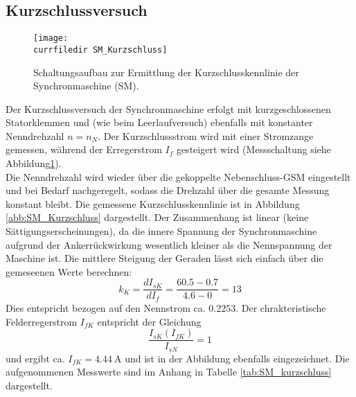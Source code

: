 \subsection{Kurzschlussversuch}
\begin{figure}
    \centering
    \texttt{[image: \\currfiledir SM\_Kurzschluss]}
    \caption{Schaltungsaufbau zur Ermittlung der Kurzschlusskennlinie der Synchronmaschine (SM).}
    \label{fig:SM_Kurzschluss}
\end{figure}
Der Kurzschlussversuch der Synchronmaschine erfolgt mit kurzgeschlossenen Statorklemmen und (wie beim Leerlaufversuch) ebenfalls mit konstanter Nenndrehzahl $n=n_N$. Der Kurzschlussstrom wird mit einer Stromzange gemessen, während der Erregerstrom $I_f$ gesteigert wird (Messschaltung siehe Abbildung\;\ref{fig:SM_Kurzschluss}).\\
Die Nenndrehzahl wird wieder über die gekoppelte Nebenschluss-GSM eingestellt und bei Bedarf nachgeregelt, sodass die Drehzahl über die gesamte Messung konstant bleibt. Die gemessene Kurzschlusskennlinie ist in Abbildung \ref{abb:SM_Kurzschluss} dargestellt. Der Zusammenhang ist linear (keine Sättigungserscheinungen), da die innere Spannung der Synchronmaschine aufgrund der Ankerrückwirkung wesentlich kleiner als die Nennspannung der Maschine ist. Die mittlere Steigung der Geraden lässt sich einfach über die gemeseenen Werte berechnen:
\begin{equation*}
    k_K = \frac{dI_{sK}}{dI_f} = \frac{60.5 - 0.7}{4.6 - 0} = 13
\end{equation*}
Dies entspricht bezogen auf den Nennstrom ca. $0.2253$. Der chrakteristische Felderregerstrom $I_{fK}$ entspricht der Gleichung 
\begin{equation*}
    \frac{I_{sK}(I_{fK})}{I_{sN}} = 1
\end{equation*}
und ergibt ca. $I_{fK} = \SI{4.44}{\ampere}$ und ist in der Abbildung ebenfalls eingezeichnet. Die aufgenommenen Messwerte sind im Anhang in Tabelle \ref{tab:SM_kurzschluss} dargestellt.

